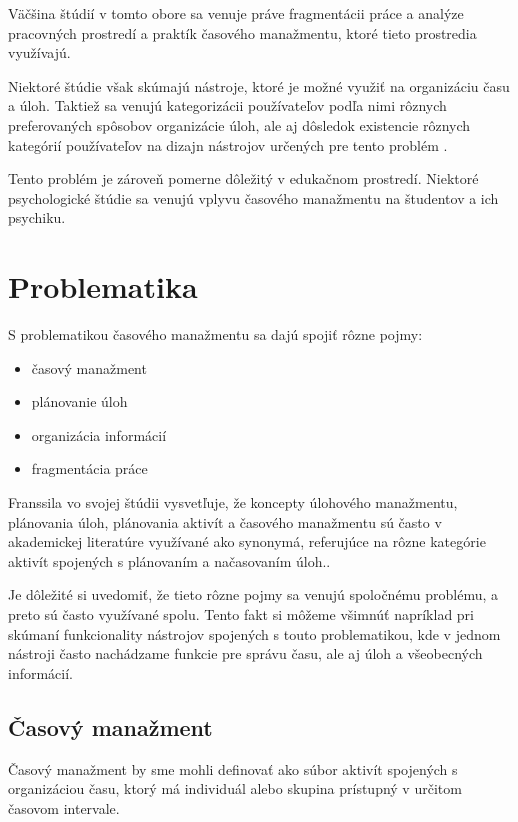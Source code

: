 \documentclass[10pt,slovak,a4paper]{article}
\begin{document}
	Väčšina štúdií v tomto obore \cite{Franssila,NoTask,Blandford} sa venuje práve fragmentácii práce a analýze pracovných prostredí a praktík časového manažmentu, ktoré tieto prostredia využívajú.
	
	Niektoré štúdie \cite{Franssila, Blandford, Haraty} však skúmajú nástroje, ktoré je možné využiť na organizáciu času a úloh. Taktiež sa venujú kategorizácii používateľov podľa nimi rôznych preferovaných spôsobov organizácie úloh, ale aj dôsledok existencie rôznych kategórií používateľov na dizajn nástrojov určených pre tento problém \cite{Haraty}.
	
	Tento problém je zároveň pomerne dôležitý v edukačnom prostredí. Niektoré psychologické štúdie \cite{Macan} sa venujú vplyvu časového manažmentu na študentov a ich psychiku.
	
\section{Problematika}

	S problematikou časového manažmentu sa dajú spojiť rôzne pojmy:
	\begin{itemize}
		\item časový manažment
		\item plánovanie úloh
		\item organizácia informácií
		\item fragmentácia práce
	\end{itemize}

	Franssila vo svojej štúdii\cite{Franssila} vysvetľuje, že koncepty úlohového manažmentu, plánovania úloh, plánovania aktivít a časového manažmentu sú často v akademickej literatúre využívané ako synonymá, referujúce na rôzne kategórie aktivít spojených s plánovaním a načasovaním úloh.\cite{Franssila}.
	
	Je dôležité si uvedomiť, že tieto rôzne pojmy sa venujú spoločnému problému, a preto sú často využívané spolu. Tento fakt si môžeme všimnúť napríklad pri skúmaní funkcionality nástrojov spojených s touto problematikou, kde v jednom nástroji často nachádzame funkcie pre správu času, ale aj úloh a všeobecných informácií.
	
	\subsection{Časový manažment}
	
		Časový manažment by sme mohli definovať ako súbor aktivít spojených s organizáciou času, ktorý má individuál alebo skupina prístupný v určitom časovom intervale.
		
\end{document}
